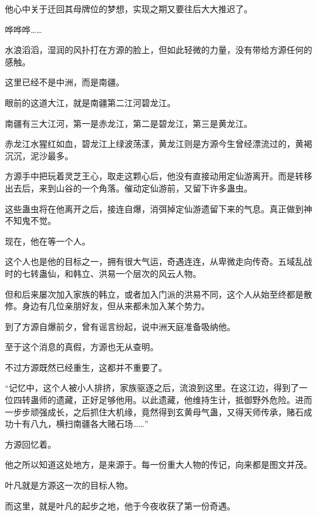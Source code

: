 \begin{this_body}
他心中关于迁回其母牌位的梦想，实现之期又要往后大大推迟了。

哗哗哗……

水浪滔滔，湿润的风扑打在方源的脸上，但如此轻微的力量，没有带给方源任何的感触。

这里已经不是中洲，而是南疆。

眼前的这道大江，就是南疆第二江河碧龙江。

南疆有三大江河，第一是赤龙江，第二是碧龙江，第三是黄龙江。

赤龙江水猩红如血，碧龙江上绿波荡漾，黄龙江则是方源今生曾经漂流过的，黄褐沉沉，泥沙最多。

方源手中把玩着灵芝王心，取走这颗心后，他没有直接动用定仙游离开。而是转移出去后，来到山谷的一个角落。催动定仙游前，又留下许多蛊虫。

这些蛊虫将在他离开之后，接连自爆，消弭掉定仙游遗留下来的气息。真正做到神不知鬼不觉。

现在，他在等一个人。

这个人也是他的目标之一，拥有很大气运，奇遇连连，从卑微走向传奇。五域乱战时的七转蛊仙，和韩立、洪易一个层次的风云人物。

但和后来屡次加入家族的韩立，或者加入门派的洪易不同，这个人从始至终都是散修。身边有几位亲朋好友，但从来都未加入某个势力。

到了方源自爆前夕，曾有谣言纷起，说中洲天庭准备吸纳他。

至于这个消息的真假，方源也无从查明。

不过方源既然已经重生，这都并不重要了。

“记忆中，这个人被小人排挤，家族驱逐之后，流浪到这里。在这江边，得到了一位四转蛊师的遗藏，正好足够他用。以此遗藏，他维持生计，抵御野外危险。进而一步步顽强成长，之后抓住大机缘，竟然得到玄黄母气蛊，又得天师传承，赌石成功十有八九，横扫南疆各大赌石场……”

方源回忆着。

他之所以知道这处地方，是来源于。每一份重大人物的传记，向来都是图文并茂。

叶凡就是方源这一次的目标人物。

而这里，就是叶凡的起步之地，他于今夜收获了第一份奇遇。

\end{this_body}

